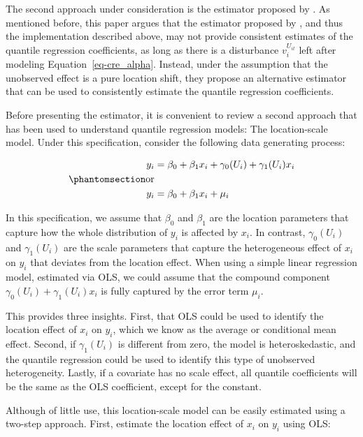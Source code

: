 \documentclass[bib]{statapress}
\begin{document}
The second approach under consideration is the estimator proposed by
\citet{canay2011}. As mentioned before, this paper argues that the
estimator proposed by \citet{abrevaya2008}, and thus the implementation
described above, may not provide consistent estimates of the quantile
regression coefficients, as long as there is a disturbance
\(v^{U_{it}}_i\) left after modeling Equation~\ref{eq-cre_alpha}.
Instead, under the assumption that the unobserved effect is a pure
location shift, they propose an alternative estimator that can be used
to consistently estimate the quantile regression coefficients.

Before presenting the estimator, it is convenient to review a second
approach that has been used to understand quantile regression models:
The location-scale model. Under this specification, consider the
following data generating process:

\begin{equation}\phantomsection\label{eq-loc-scale}{\begin{aligned}
y_i &= \beta_0+\beta_1 x_i + \gamma_0(U_i) + \gamma_1(U_i) x_{i} \\ \text{or}\\
y_i &= \beta_0+\beta_1 x_i + \mu_i
\end{aligned}
}\end{equation}

In this specification, we assume that \(\beta_0\) and \(\beta_1\) are
the location parameters that capture how the whole distribution of
\(y_i\) is affected by \(x_i\). In contrast, \(\gamma_0(U_i)\) and
\(\gamma_1(U_i)\) are the scale parameters that capture the
heterogeneous effect of \(x_i\) on \(y_i\) that deviates from the
location effect. When using a simple linear regression model, estimated
via OLS, we could assume that the compound component
\(\gamma_0(U_i) + \gamma_1(U_i) x_{i}\) is fully captured by the error
term \(\mu_i\).

This provides three insights. First, that OLS could be used to identify
the location effect of \(x_i\) on \(y_i\), which we know as the average
or conditional mean effect. Second, if \(\gamma_1(U_i)\) is different
from zero, the model is heteroskedastic, and the quantile regression
could be used to identify this type of unobserved heterogeneity. Lastly,
if a covariate has no scale effect, all quantile coefficients will be
the same as the OLS coefficient, except for the constant.

Although of little use, this location-scale model can be easily
estimated using a two-step approach. First, estimate the location effect
of \(x_i\) on \(y_i\) using OLS:
\end{document}
